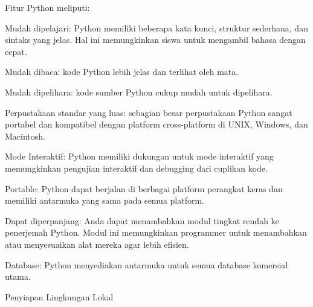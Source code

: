 \noindent 
{\fontsize{14pt}{14pt}\selectfont Fitur Python meliputi: \\} \par
\vspace{14pt}
\noindent 
{\fontsize{14pt}{14pt}\selectfont Mudah dipelajari: Python memiliki beberapa kata kunci, struktur sederhana, dan sintaks yang jelas. Hal ini memungkinkan siswa untuk mengambil bahasa dengan cepat. \\} \par
\vspace{14pt}
\noindent 
{\fontsize{14pt}{14pt}\selectfont Mudah dibaca: kode Python lebih jelas dan terlihat oleh mata. \\} \par
\vspace{14pt}
\noindent 
{\fontsize{14pt}{14pt}\selectfont Mudah dipelihara: kode sumber Python cukup mudah untuk dipelihara. \\} \par
\vspace{14pt}
\noindent 
{\fontsize{14pt}{14pt}\selectfont Perpustakaan standar yang luas: sebagian besar perpustakaan Python sangat portabel dan kompatibel dengan platform cross-platform di UNIX, Windows, dan Macintosh. \\} \par
\noindent 
{\fontsize{14pt}{14pt}\selectfont Mode Interaktif: Python memiliki dukungan untuk mode interaktif yang memungkinkan pengujian interaktif dan debugging dari cuplikan kode. \\} \par
\vspace{14pt}
\noindent 
{\fontsize{14pt}{14pt}\selectfont Portable: Python dapat berjalan di berbagai platform perangkat keras dan memiliki antarmuka yang sama pada semua platform. \\} \par
\vspace{14pt}
\noindent 
{\fontsize{14pt}{14pt}\selectfont Dapat diperpanjang: Anda dapat menambahkan modul tingkat rendah ke penerjemah Python. Modul ini memungkinkan programmer untuk menambahkan atau menyesuaikan alat mereka agar lebih efisien. \\} \par
\vspace{14pt}
\noindent 
{\fontsize{14pt}{14pt}\selectfont Database: Python menyediakan antarmuka untuk semua database komersial utama. \\} \par
\noindent 
{\fontsize{14pt}{14pt}\selectfont Penyiapan Lingkungan Lokal \\} \par
